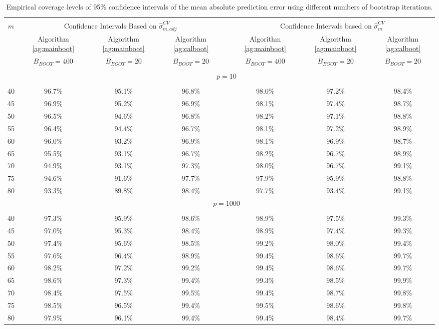 \documentclass[12pt]{article}
\begin{document}
\begin{table}[ht]{
\centering
\setlength{\tabcolsep}{3pt}
\renewcommand{\arraystretch}{0.5}
\begin{tabular}{ cccccccc }
\hline\\
$m$   & \multicolumn{3}{c}{Confidence Intervals Based on $\widehat{\sigma}_{m,adj}^{CV}$} &&  \multicolumn{3}{c}{Confidence Intervals based on $\widehat{\sigma}_m^{CV}$}\\
    & Algorithm \ref{ag:mainboot} & Algorithm \ref{ag:mainboot} & Algorithm \ref{ag:calboot} && Algorithm \ref{ag:mainboot} & Algorithm \ref{ag:mainboot} & Algorithm \ref{ag:calboot}\\  
    & $B_{BOOT}=400$  & $B_{BOOT}=20$  & $B_{BOOT}=20$  && $B_{BOOT}=400$  & $B_{BOOT}=20$ & $B_{BOOT}=20$\\
        \cline{2-4} \cline{6-8}\\
        & \multicolumn{7}{c}{$p=10$}\\
        \cline{2-8}\\
40  & 96.7\% & 95.1\% & 96.8\% && 98.0\% & 97.2\% & 98.4\%\\
45  & 96.9\% & 95.2\% & 96.9\% && 98.1\% & 97.4\% & 98.7\%\\
50  & 96.5\% & 94.6\% & 96.8\% && 98.2\% & 97.1\% & 98.8\%\\
55  & 96.4\% & 94.4\% & 96.7\% && 98.1\% & 97.2\% & 98.9\%\\
60  & 96.0\% & 93.2\% & 96.9\% && 98.1\% & 96.9\% & 98.7\%\\
65  & 95.5\% & 93.1\% & 96.7\% && 98.2\% & 96.7\% & 98.9\%\\
70  & 94.9\% & 93.1\% & 97.3\% && 98.0\% & 96.7\% & 99.1\%\\
75  & 94.6\% & 91.6\% & 97.7\% && 97.9\% & 95.9\% & 98.8\%\\
80  & 93.3\% & 89.8\% & 98.4\% && 97.7\% & 93.4\% & 99.1\%\\
   & \multicolumn{7}{c}{$p = 1000$} \\
   \cline{2-8}\\
40  &  97.3\% & 95.9\% & 98.6\% && 98.9\% & 97.5\% & 99.3\%\\
45  &  97.0\% & 95.3\% & 98.4\% && 98.9\% & 97.4\% & 99.3\%\\
50  &  97.4\% & 95.6\% & 98.5\% && 99.2\% & 98.0\% & 99.4\%\\
55  &  97.6\% & 96.4\% & 98.9\% && 99.4\% & 98.6\% & 99.7\%\\
60  &  98.2\% & 97.2\% & 99.2\% && 99.4\% & 98.6\% & 99.7\%\\
65  &  98.6\% & 97.3\% & 99.4\% && 99.3\% & 98.5\% & 99.9\%\\
70  &  98.4\% & 97.5\% & 99.5\% && 99.4\% & 98.7\% & 99.8\%\\
75  &  98.5\% & 96.5\% & 99.4\% && 99.5\% & 98.6\% & 99.8\%\\
80  &  97.9\% & 96.1\% & 99.4\% && 99.4\% & 98.4\% & 99.7\%
\end{tabular}
\caption{Empirical coverage levels of 95\% confidence intervals of the mean absolute prediction error using different numbers of bootstrap iterations.} \label{tab:simulmsmall}}
\end{table} 
\end{document}
